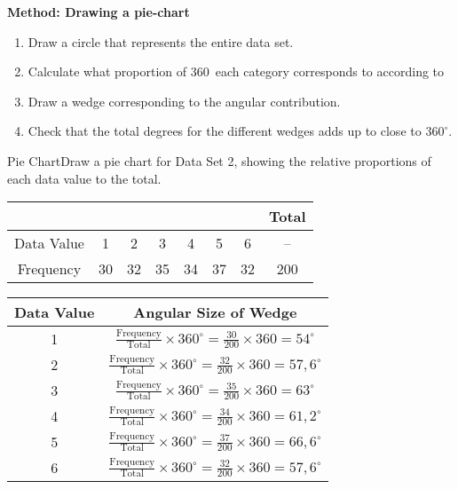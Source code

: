 \documentclass[10pt,a4paper,titlepage,twoside,openright]{report}
\begin{document}
\textbf{Method: Drawing a pie-chart}
\begin{enumerate}
\item Draw a circle that represents the entire data set.
\item Calculate what proportion of 360\deg \, each category corresponds to according to 
\item Draw a wedge corresponding to the angular contribution.
\item Check that the total degrees for the different wedges adds up to close to $360^\circ$.
\end{enumerate}

\begin{wex}{Pie Chart}{Draw a pie chart for Data Set 2, showing the relative proportions of each data value to the total.}{

\begin{center}
\begin{tabular}{|c||c|c|c|c|c|c||c|}\hline
\multicolumn{7}{|c||}{}&Total\\\hline
Data Value & 1 & 2 & 3 & 4 & 5 & 6 & --\\\hline
Frequency & 30 & 32 & 35 & 34 & 37 & 32& 200\\\hline
\end{tabular}
\end{center}


\begin{center}
\begin{tabular}{|c|c|}\hline
Data Value & Angular Size of Wedge\\\hline
1 & $\frac{\mbox{Frequency}}{\mbox{Total}} \times 360^\circ = \frac{30}{200}\times 360 = 54^\circ$\\\hline
2 & $\frac{\mbox{Frequency}}{\mbox{Total}} \times 360^\circ = \frac{32}{200}\times 360 = 57,6^\circ$\\\hline
3 & $\frac{\mbox{Frequency}}{\mbox{Total}} \times 360^\circ = \frac{35}{200}\times 360 = 63^\circ$\\\hline
4 & $\frac{\mbox{Frequency}}{\mbox{Total}} \times 360^\circ = \frac{34}{200}\times 360 = 61,2^\circ$\\\hline
5 & $\frac{\mbox{Frequency}}{\mbox{Total}} \times 360^\circ = \frac{37}{200}\times 360 = 66,6^\circ$\\\hline
6 & $\frac{\mbox{Frequency}}{\mbox{Total}} \times 360^\circ = \frac{32}{200}\times 360 = 57,6^\circ$\\\hline
\end{tabular}
\end{center}

}
\end{wex}
\end{document}
